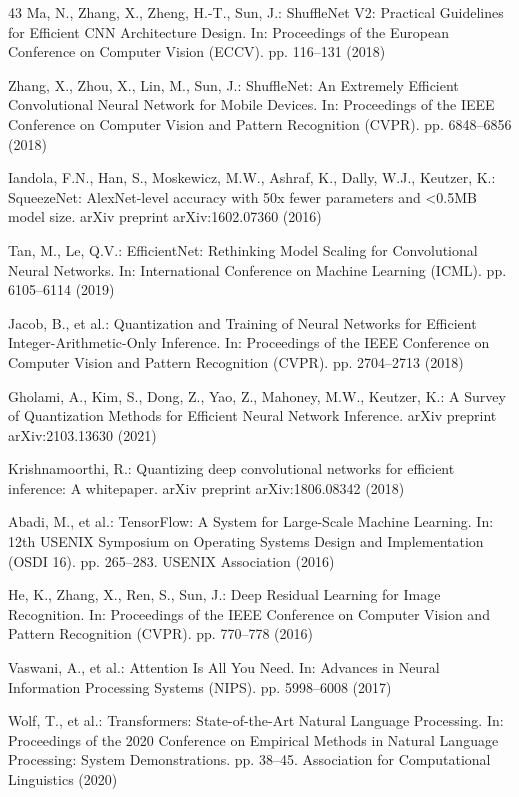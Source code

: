 \documentclass[conference]{IEEEtran}
\begin{document}
\begin{thebibliography}{43}
Ma, N., Zhang, X., Zheng, H.-T., Sun, J.: ShuffleNet V2: Practical Guidelines for Efficient CNN Architecture Design. In: Proceedings of the European Conference on Computer Vision (ECCV). pp. 116--131 (2018)

Zhang, X., Zhou, X., Lin, M., Sun, J.: ShuffleNet: An Extremely Efficient Convolutional Neural Network for Mobile Devices. In: Proceedings of the IEEE Conference on Computer Vision and Pattern Recognition (CVPR). pp. 6848--6856 (2018)

Iandola, F.N., Han, S., Moskewicz, M.W., Ashraf, K., Dally, W.J., Keutzer, K.: SqueezeNet: AlexNet-level accuracy with 50x fewer parameters and <0.5MB model size. arXiv preprint arXiv:1602.07360 (2016)

Tan, M., Le, Q.V.: EfficientNet: Rethinking Model Scaling for Convolutional Neural Networks. In: International Conference on Machine Learning (ICML). pp. 6105--6114 (2019)

Jacob, B., et al.: Quantization and Training of Neural Networks for Efficient Integer-Arithmetic-Only Inference. In: Proceedings of the IEEE Conference on Computer Vision and Pattern Recognition (CVPR). pp. 2704--2713 (2018)

Gholami, A., Kim, S., Dong, Z., Yao, Z., Mahoney, M.W., Keutzer, K.: A Survey of Quantization Methods for Efficient Neural Network Inference. arXiv preprint arXiv:2103.13630 (2021)

Krishnamoorthi, R.: Quantizing deep convolutional networks for efficient inference: A whitepaper. arXiv preprint arXiv:1806.08342 (2018)

Abadi, M., et al.: TensorFlow: A System for Large-Scale Machine Learning. In: 12th USENIX Symposium on Operating Systems Design and Implementation (OSDI 16). pp. 265--283. USENIX Association (2016)

He, K., Zhang, X., Ren, S., Sun, J.: Deep Residual Learning for Image Recognition. In: Proceedings of the IEEE Conference on Computer Vision and Pattern Recognition (CVPR). pp. 770--778 (2016)

Vaswani, A., et al.: Attention Is All You Need. In: Advances in Neural Information Processing Systems (NIPS). pp. 5998--6008 (2017)

Wolf, T., et al.: Transformers: State-of-the-Art Natural Language Processing. In: Proceedings of the 2020 Conference on Empirical Methods in Natural Language Processing: System Demonstrations. pp. 38--45. Association for Computational Linguistics (2020)


\end{thebibliography}
\end{document}
